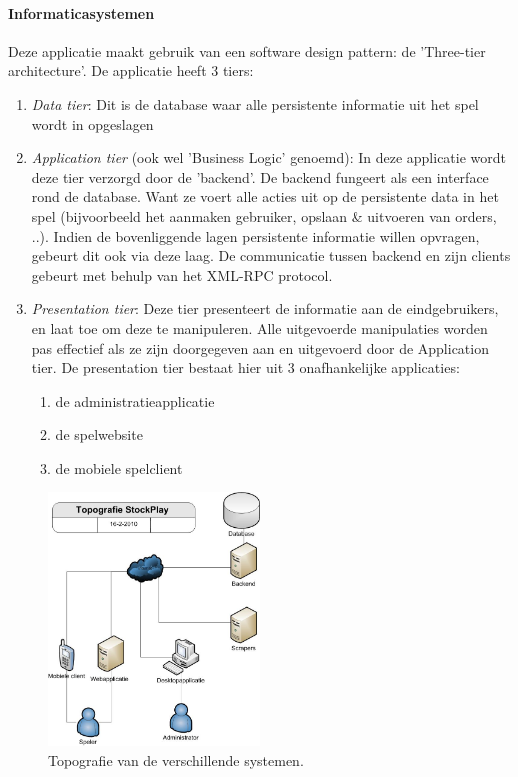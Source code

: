 \paragraph{Informaticasystemen}Deze applicatie maakt gebruik van een software design pattern: de 'Three-tier architecture'. De applicatie heeft 3 tiers:
\begin{enumerate}
	\item\emph{Data tier}: Dit is de database waar alle persistente informatie uit het spel wordt in opgeslagen
	\item\emph{Application tier} (ook wel 'Business Logic' genoemd): In deze applicatie wordt deze tier verzorgd door de 'backend'. De backend fungeert als een interface rond de database. Want ze voert alle acties uit op de persistente data in het spel (bijvoorbeeld het aanmaken gebruiker, opslaan \& uitvoeren van orders, ..). Indien de bovenliggende lagen persistente informatie willen opvragen, gebeurt dit ook via deze laag. De communicatie tussen backend en zijn clients gebeurt met behulp van het XML-RPC protocol. 
	\item\emph{Presentation tier}: Deze tier presenteert de informatie aan de eindgebruikers, en laat toe om deze te manipuleren. Alle uitgevoerde manipulaties worden pas effectief als ze zijn doorgegeven aan en uitgevoerd door de Application tier.
De presentation tier bestaat hier uit 3 onafhankelijke applicaties:
	\begin{enumerate}
		\item{de administratieapplicatie}
		\item{de spelwebsite}
		\item{de mobiele spelclient}
	\end{enumerate}
\end{enumerate}
\begin{figure}[h!]
	\centering
		\includegraphics[width=0.5\textwidth]{images/ontwerp/topografie}
	\caption{Topografie van de verschillende systemen.}
\end{figure}

